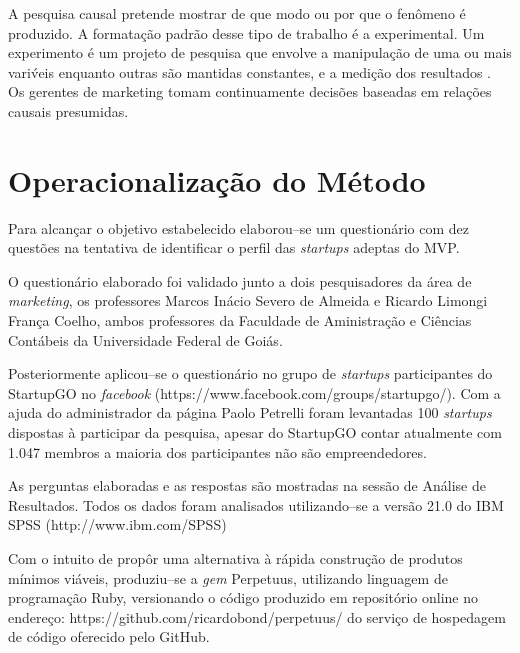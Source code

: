 A pesquisa causal pretende mostrar de que modo ou por que o fen\^omeno \'e produzido. A formata\c{c}\~ao padr\~ao desse tipo de trabalho \'e a experimental. Um experimento \'e um projeto de pesquisa que envolve a manipula\c{c}\~ao de uma ou mais vari\'veis enquanto outras s\~ao mantidas constantes, e a medi\c{c}\~ao dos resultados \cite{churchill2009marketing} \cite{malhotra2006pesquisa}. Os gerentes de marketing tomam continuamente decis\~oes baseadas em rela\c{c}\~oes causais presumidas.

\section{Operacionaliza\c{c}\~ao do M\'etodo}

Para alcan\c{c}ar o objetivo estabelecido elaborou--se um question\'ario com dez quest\~oes na tentativa de identificar o perfil das \emph{startups} adeptas do MVP.

O question\'ario elaborado foi validado junto a dois pesquisadores da \'area de \emph{marketing}, os professores Marcos In\'acio Severo de Almeida e Ricardo Limongi Fran\c{c}a Coelho, ambos professores da Faculdade de Aministra\c{c}\~ao e Ci\^encias Cont\'abeis da Universidade Federal de Goi\'as.

Posteriormente aplicou--se o question\'ario no grupo de \emph{startups} participantes do StartupGO no \emph{facebook} (https://www.facebook.com/groups/startupgo/). Com a ajuda do administrador da p\'agina Paolo Petrelli foram levantadas 100 \emph{startups} dispostas \`a participar da pesquisa, apesar do StartupGO contar atualmente com 1.047 membros a maioria dos participantes n\~ao s\~ao empreendedores.

As perguntas elaboradas e as respostas s\~ao mostradas na sess\~ao de An\'alise de Resultados. Todos os dados foram analisados utilizando--se a vers\~ao 21.0 do IBM SPSS (http://www.ibm.com/SPSS)

Com o intuito de prop\^or uma alternativa \`a r\'apida constru\c{c}\~ao de produtos m\'inimos vi\'aveis, produziu--se a \emph{gem} Perpetuus, utilizando linguagem de programa\c{c}\~ao Ruby, versionando o c\'odigo produzido em reposit\'orio online no endere\c{c}o: https://github.com/ricardobond/perpetuus/ do servi\c{c}o de hospedagem de c\'odigo oferecido pelo GitHub.